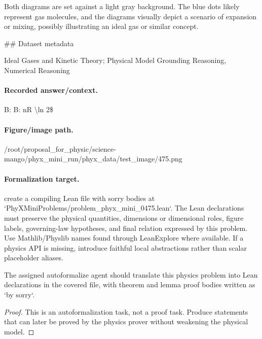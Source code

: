 Both diagrams are set against a light gray background. The blue dots likely represent gas molecules, and the diagrams visually depict a scenario of expansion or mixing, possibly illustrating an ideal gas or similar concept.

\#\# Dataset metadata

Ideal Gases and Kinetic Theory; Physical Model Grounding Reasoning, Numerical Reasoning

\paragraph{Recorded answer/context.}
B: B: nR \textbackslash{}ln 2\$

\paragraph{Figure/image path.}
/root/proposal\_for\_physic/science-mango/phyx\_mini\_run/phyx\_data/test\_image/475.png

\paragraph{Formalization target.}
create a compiling Lean file with sorry bodies at `PhyXMiniProblems/problem\_phyx\_mini\_0475.lean`. The Lean declarations must preserve the physical quantities, dimensions or dimensional roles, figure labels, governing-law hypotheses, and final relation expressed by this problem.
Use Mathlib/Physlib names found through LeanExplore where available. If a physics API is missing, introduce faithful local abstractions rather than scalar placeholder aliases.

\begin{theorem}
\label{thm:physics:phyx_mini_0475:target}
The assigned autoformalize agent should translate this physics problem into Lean declarations in the covered file, with theorem and lemma proof bodies written as `by sorry`.
\end{theorem}
\begin{proof}
This is an autoformalization task, not a proof task. Produce statements that can later be proved by the physics prover without weakening the physical model.
\end{proof}

